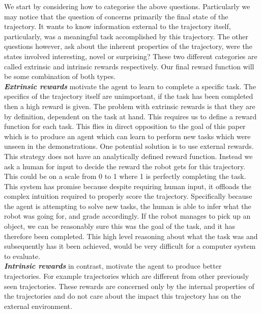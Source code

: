 We start by considering how to categorise the above questions. Particularly we may notice that the question of  concerns primarily the final state of the trajectory. It wants to know information external to the trajectory itself, particularly, was a meaningful task accomplished by this trajectory. The other questions however, ask about the inherent properties of the trajectory, were the states involved interesting, novel or surprising? These two different categories are called extrinsic and intrinsic rewards respectively. Our final reward function will be some combination of both types.\\
\textbf{\textit{Extrinsic rewards}} motivate the agent to learn to complete a specific task. The specifics of the trajectory itself are unimportant, if the task has been completed then a high reward is given. The problem with extrinsic rewards is that they are by definition, dependent on the task at hand. This requires us to define a reward function for each task. This flies in direct opposition to the goal of this paper which is to produce an agent which can learn to perform new tasks which were unseen in the demonstrations. One potential solution is to use external rewards. This strategy does not have an analytically defined reward function. Instead we ask a human for input to decide the reward the robot gets for this trajectory. This could be on a scale from 0 to 1 where 1 is perfectly completing the task. This system has promise because despite requiring human input, it offloads the complex intuition required to properly score the trajectory. Specifically because the agent is attempting to solve new tasks, the human is able to infer what the robot was going for, and grade accordingly. If the robot manages to pick up an object, we can be reasonably sure this was the goal of the task, and it has therefore been completed. This high level reasoning about what the task was and subsequently has it been achieved, would be very difficult for a computer system to evaluate.\\
\textbf{\textit{Intrinsic rewards}} in contrast, motivate the agent to produce better trajectories. For example trajectories which are different from other previously seen trajectories. These rewards are concerned only by the internal properties of the trajectories and do not care about the impact this trajectory has on the external environment.






